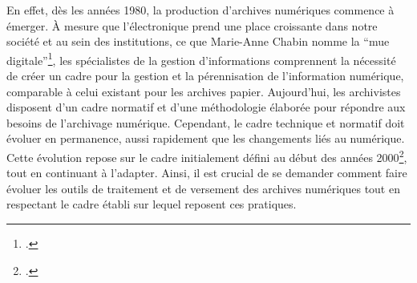 \documentclass[a4paper,12pt,twoside]{book}
\begin{document}
En effet, dès les années 1980, la production d’archives numériques commence à émerger. À mesure que l’électronique prend une place croissante dans notre société et au sein des institutions, ce que Marie-Anne Chabin nomme la \enquote{mue digitale}\footcite{chabin_transformation_2017}, les spécialistes de la gestion d’informations comprennent la nécessité de créer un cadre pour la gestion et la pérennisation de l’information numérique, comparable à celui existant pour les archives papier. Aujourd’hui, les archivistes disposent d’un cadre normatif et d’une méthodologie élaborée pour répondre aux besoins de l’archivage numérique. Cependant, le cadre technique et normatif doit évoluer en permanence, aussi rapidement que les changements liés au numérique. Cette évolution repose sur le cadre initialement défini au début des années 2000\footcite[p.5]{nichele_preparer_2021}, tout en continuant à l'adapter. Ainsi, il est crucial de se demander comment faire évoluer les outils de traitement et de versement des archives numériques tout en respectant le cadre établi sur lequel reposent ces pratiques.
\end{document}
